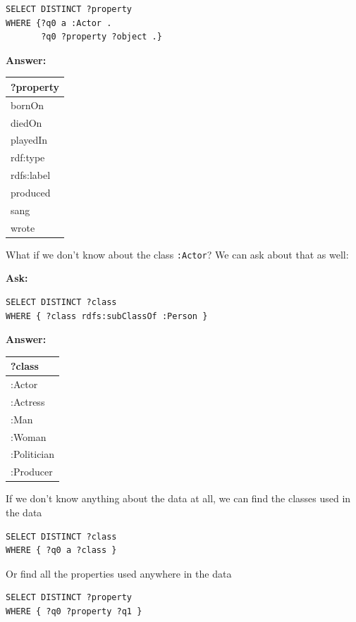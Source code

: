 
\begin{lstlisting}
SELECT DISTINCT ?property
WHERE {?q0 a :Actor .
       ?q0 ?property ?object .}
\end{lstlisting}

\textbf{\textbf{Answer:}}

\begin{tabular}{|l|}
\hline
?property\\
\hline
bornOn\\
diedOn\\
playedIn\\
rdf:type\\
rdfs:label\\
produced\\
sang\\
wrote\\
\hline
\end{tabular}

What if we don't know about the class \texttt{:Actor}? We can ask about that as
well:

\textbf{\textbf{Ask:}}

\begin{lstlisting}
SELECT DISTINCT ?class
WHERE { ?class rdfs:subClassOf :Person }
\end{lstlisting}

\textbf{\textbf{Answer:}}

\begin{tabular}{|l|}
\hline
?class\\
\hline
:Actor\\
:Actress\\
:Man\\
:Woman\\
:Politician\\
:Producer\\
\hline
\end{tabular}

If we don't know anything about the data at all, we can find the classes
used in the data

\begin{lstlisting}
SELECT DISTINCT ?class
WHERE { ?q0 a ?class }
\end{lstlisting}

Or find all the properties used anywhere in the data

\begin{lstlisting}
SELECT DISTINCT ?property
WHERE { ?q0 ?property ?q1 }
\end{lstlisting}

